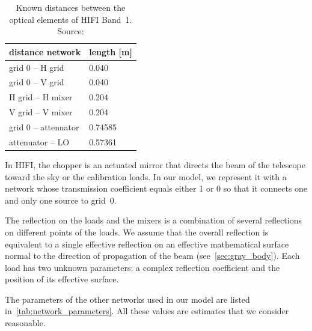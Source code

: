 \begin{table}[hbtp]
    \centering
    \begin{tabular}{ll}
        \toprule
        distance network     & length [\si{\meter}] \\
        \midrule
        grid 0 -- H grid     & \num{0.040}   \\
        grid 0 -- V grid     & \num{0.040}   \\
        H grid -- H mixer    & \num{0.204}   \\
        V grid -- V mixer    & \num{0.204}   \\
        grid 0 -- attenuator & \num{0.74585} \\
        attenuator -- LO     & \num{0.57361} \\
        \bottomrule
    \end{tabular}
    \caption{
        Known distances between the optical elements of HIFI Band~1.
        Source: 
    }
    \label{tab:known_distances}
\end{table}

In HIFI, the chopper is an actuated mirror that directs the beam of the telescope toward the sky or the calibration loads.
In our model, we represent it with a network whose transmission coefficient equals either 1 or 0 so that it connects one and only one source to grid~0.

The reflection on the loads and the mixers is a combination of several reflections on different points of the loads.
We assume that the overall reflection is equivalent to a single effective reflection on an effective mathematical surface normal to the direction of propagation of the beam (see~\cref{sec:gray_body}).
Each load has two unknown parameters: a complex reflection coefficient and the position of its effective surface.

The parameters of the other networks used in our model are listed in~\cref{tab:network_parameters}.
All these values are estimates that we consider reasonable.

